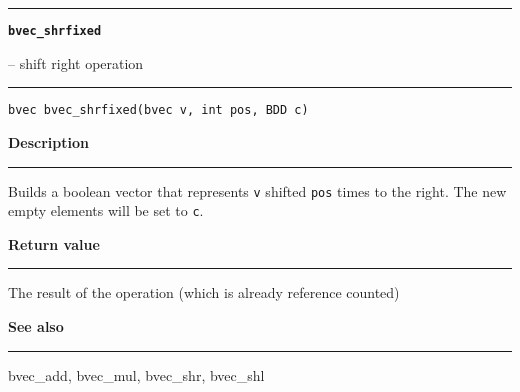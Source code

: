 \begin{minipage}{\textwidth}

\noindent\begin{minipage}{\textwidth}
\rule{\textwidth}{0.5mm}
{\tt\bf bvec\_shrfixed }
\--- shift right operation  \hspace{\fill}
\\\rule[1.5ex]{\textwidth}{0.5mm}
\end{minipage}

\noindent\begin{verbatim}
bvec bvec_shrfixed(bvec v, int pos, BDD c) 
\end{verbatim}

\vspace{\parsep}\noindent
{\bf Description}\\\rule[1.5ex]{\textwidth}{0.2mm}\vspace{-1.5ex}\setlength{\parindent}{1em}
Builds a boolean vector that represents {\tt v} shifted {\tt pos}
           times to the right. The new empty elements will be set to {\tt c}.

\setlength{\parindent}{0em}\vspace{\parsep}\vspace{\baselineskip}\noindent
{\bf Return value}\\\rule[1.5ex]{\textwidth}{0.2mm}\vspace{-1.5ex}
The result of the operation (which is already reference counted) 

\vspace{\parsep}\vspace{\baselineskip}\noindent
{\bf See also}\\\rule[1.5ex]{\textwidth}{0.2mm}\vspace{-1.5ex}
bvec\_add, bvec\_mul, bvec\_shr, bvec\_shl 
\end{minipage}
\vspace{8ex}
